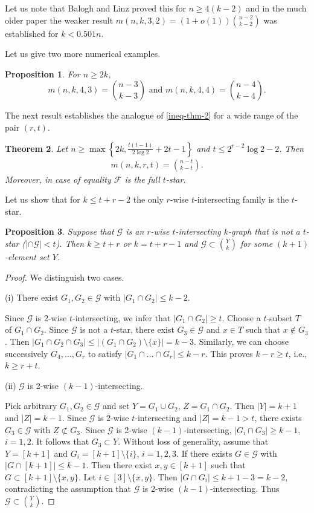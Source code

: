 \documentclass[11pt,a4paper]{article}
\newtheorem{thm}{Theorem}[section]
\newtheorem{prop}[thm]{Proposition}
\newtheorem{false statement}{False statement}
\theoremstyle{definition}
\def\hf{\mathcal{F}}
\def\hg{\mathcal{G}}
\begin{document}
 Let us note that Balogh and Linz \cite{BL} proved this for $n\geq 4(k-2)$ and in the much older paper \cite{FT}
 the weaker result $m(n,k,3,2) =(1+o(1)){n-2 \choose k-2}$ was established for $k<0.501 n$.

 Let us give two more numerical examples.

\begin{prop}\label{prop-main1}
For $n\geq 2k$,
\[
m(n,k,4,3) =\binom{n-3}{k-3}\mbox{ and } m(n,k,4,4) =\binom{n-4}{k-4}.
\]
\end{prop}


The next result establishes the analogue of \eqref{ineq-thm-2} for a wide range of the pair $(r,t)$.

\begin{thm}\label{thm:main-3}
Let $n\geq \max\left\{2k, \frac{t(t-1)}{2\log 2} +2t-1\right\}$ and $t\leq 2^{r-2}\log 2-2$.  Then
\begin{align}\label{ineq-5.2}
m(n,k,r,t) =\binom{n-t}{k-t}.
\end{align}
Moreover, in case of equality $\hf$ is the full $t$-star.
\end{thm}




Let us show that for $k\leq t+r-2$ the only $r$-wise $t$-intersecting family is the $t$-star.

\begin{prop}\label{prop-1.7}
Suppose that $\hg$ is an $r$-wise $t$-intersecting $k$-graph that is not a $t$-star ($|\cap \hg| <t$). Then $k\geq t+r$ or $k=t+r-1$ and $\hg\subset \binom{Y}{k}$ for some $(k+1)$-element set $Y$.
\end{prop}

\begin{proof}
We distinguish two cases.

(i) There exist $G_1,G_2\in \hg$ with $|G_1\cap G_2|\leq k-2$.

Since $\hg$ is 2-wise $t$-intersecting, we infer that $|G_1\cap G_2|\geq t$. Choose a $t$-subset $T$ of $G_1\cap G_2$.
Since $\hg$ is not a $t$-star,  there exist $G_3\in \hg$ and $x\in T$ such that $x\notin G_3$. Then $|G_1\cap G_2\cap G_3| \leq |(G_1\cap G_2)\setminus \{x\}|= k-3$. Similarly,
we can choose successively $G_4,\ldots,G_r$ to satisfy $|G_1\cap \ldots \cap G_r|\leq k-r$. This proves $k-r\geq t$, i.e., $k\geq r+t$.

(ii) $\hg$ is 2-wise $(k-1)$-intersecting.

Pick arbitrary $G_1,G_2\in \hg$ and set $Y=G_1\cup G_2$, $Z=G_1\cap G_2$. Then $|Y|=k+1$ and $|Z|=k-1$. Since $\hg$ is 2-wise $t$-intersecting and $|Z|=k-1>t$, there exists $G_3\in \hg$ with $Z\not\subset G_3$. Since $\hg$ is 2-wise $(k-1)$-intersecting, $|G_i\cap G_3|\geq k-1$, $i=1,2$. It follows that $G_3\subset Y$. Without loss of generality, assume that $Y=[k+1]$ and  $G_i=[k+1]\setminus \{i\}$, $i=1,2,3$. If there exists $G\in \hg$ with $|G\cap [k+1]|\leq k-1$. Then there exist $x,y\in [k+1]$ such that $G\subset [k+1]\setminus \{x,y\}$. Let $i\in [3]\setminus \{x,y\}$.  Then $|G\cap G_i|\leq k+1-3=k-2$, contradicting the assumption that $\hg$ is 2-wise $(k-1)$-intersecting. Thus $\hg\subset \binom{Y}{k}$.
\end{proof}
\end{document}
